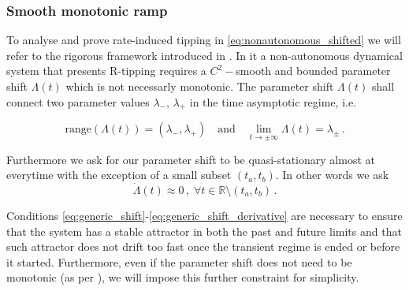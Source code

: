 \documentclass[../main.tex]{subfiles}
\begin{document}
\subsubsection{Smooth monotonic ramp}\label{subsubsec:ramp}

To analyse and prove rate-induced tipping in \eqref{eq:nonautonomous_shifted} we will refer to the rigorous framework introduced in \cite{Ashwin17}.
In it a non-autonomous dynamical system that presents R-tipping requires a $C^{2}-$smooth and bounded parameter shift $\Lambda(t)$ which is not necessarly monotonic.
The parameter shift $\Lambda(t)$ shall connect two parameter values $\lambda_{-},\,\lambda_{+}$ in the time asymptotic regime, i.e.

\begin{equation}\label{eq:generic_shift}
     \text{range}(\Lambda(t))=(\lambda_{-},\lambda_{+})\quad \text{and}\quad \lim_{t\to\pm\infty}\Lambda(t)=\lambda_{\pm}\,.
\end{equation}

Furthermore we ask for our parameter shift to be quasi-stationary almost at everytime with the exception of a small subset $(t_{a},t_{b})$.
In other words we ask
\begin{equation}\label{eq:generic_shift_derivative}
        \dot{\Lambda}(t) \approx 0\,,\;\forall t\in \mathbb{R}\setminus(t_{a},t_{b})\,. 
\end{equation}

Conditions \eqref{eq:generic_shift}-\eqref{eq:generic_shift_derivative} are necessary to ensure that the system has a stable attractor in both the past and future limits and that such attractor does not drift too fast once the transient regime is ended or before it started.
Furthermore, even if the parameter shift does not need to be monotonic (as per \cite{Ashwin17}), we will impose this further constraint for simplicity.
\end{document}
